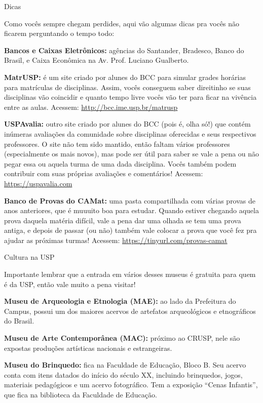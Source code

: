 \begin{secao}{Dicas}

Como vocês sempre chegam perdides, aqui vão algumas dicas pra vocês não
ficarem perguntando o tempo todo:

{\bf Bancos e Caixas Eletrônicos:} agências do Santander, Bradesco,
Banco do Brasil, e Caixa Econômica na Av. Prof. Luciano Gualberto.

{\bf MatrUSP:} é um site criado por alunes do BCC para simular grades horárias
para matrículas de disciplinas. Assim, vocês conseguem saber direitinho se suas
disciplinas vão coincidir e quanto tempo livre vocês vão ter para ficar na
vivência entre as aulas. Acessem: \url{http://bcc.ime.usp.br/matrusp}

{\bf USPAvalia:} outro site criado por alunes do BCC (pois é, olha só!) que
contém inúmeras avaliações da comunidade sobre disciplinas oferecidas e
seus respectivos professores. O site não tem sido mantido, então faltam vários
professores (especialmente os mais novos), mas pode ser útil para saber se vale a pena 
ou não pegar essa ou aquela turma de uma dada disciplina. Vocês também podem 
contribuir com suas próprias avaliações e comentários! Acessem: \url{https://uspavalia.com}

{\bf Banco de Provas do CAMat:} uma pasta compartilhada com várias provas de
anos anteriores, que é muuuito boa para estudar. Quando estiver chegando aquela
prova daquela matéria difícil, vale a pena dar uma olhada se tem uma prova antiga,
e depois de passar (ou não) também vale colocar a prova que você fez pra ajudar
as próximas turmas! Acessem: \url{https://tinyurl.com/provas-camat}

\begin{subsecao}{Cultura na USP}

Importante lembrar que a entrada em vários desses museus é gratuita para quem é da
USP, então vale muito a pena visitar!

{\bf Museu de Arqueologia e Etnologia (MAE):} ao lado da Prefeitura do Campus,
possui um dos maiores acervos de artefatos arqueológicos e etnográficos do Brasil.

{\bf Museu de Arte Contemporânea (MAC):} próximo ao CRUSP, nele são expostas
produções artísticas nacionais e estrangeiras.

{\bf Museu do Brinquedo:} fica na Faculdade de Educação, Bloco B. Seu acervo conta 
com itens datados do início do século XX, incluindo brinquedos, jogos, materiais
pedagógicos e um acervo fotográfico. Tem a exposição ``Cenas Infantis'', que fica na
biblioteca da Faculdade de Educação.


\end{subsecao}
\end{secao}
